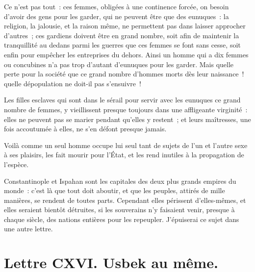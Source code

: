 \documentclass[french,twoside]{book} %
\newcommand{\dateline}[1]{\medskip{\RaggedLeft{#1}\par}\bigskip}
\begin{document}
Ce n’est pas tout : ces femmes, obligées à une continence forcée, on besoin d’avoir des gens pour les garder, qui ne peuvent être que des eunuques : la religion, la jalousie, et la raison même, ne permettent pas dans laisser approcher d’autres ; ces gardiens doivent être en grand nombre, soit afin de maintenir la tranquillité au dedans parmi les guerres que ces femmes se font sans cesse, soit enfin pour empêcher les entreprises du dehors. Ainsi un homme qui a dix femmes ou concubines n’a pas trop d’autant d’eunuques pour les garder. Mais quelle perte pour la société que ce grand nombre d’hommes morts dès leur naissance ! quelle dépopulation ne doit-il pas s’ensuivre !\par
Les filles esclaves qui sont dans le sérail pour servir avec les eunuques ce grand nombre de femmes, y vieillissent presque toujours dans une affligeante virginité : elles ne peuvent pas se marier pendant qu’elles y restent ; et leurs maîtresses, une fois accoutumée à elles, ne s’en défont presque jamais.\par
Voilà comme un seul homme occupe lui seul tant de sujets de l’un et l’autre sexe à ses plaisirs, les fait mourir pour l’État, et les rend inutiles à la propagation de l’espèce.\par
Constantinople et Ispahan sont les capitales des deux plus grands empires du monde : c’est là que tout doit aboutir, et que les peuples, attirés de mille manières, se rendent de toutes parts. Cependant elles périssent d’elles-mêmes, et elles seraient bientôt détruites, si les souverains n’y faisaient venir, presque à chaque siècle, des nations entières pour les repeupler. J’épuiserai ce sujet dans une autre lettre.\par

\dateline{De Paris, le 13 de la lune de Chahban, 1718.}
\section[{Lettre CXVI. Usbek au même.}]{Lettre CXVI. Usbek au même.}\renewcommand{\leftmark}{Lettre CXVI. Usbek au même.}
\end{document}
